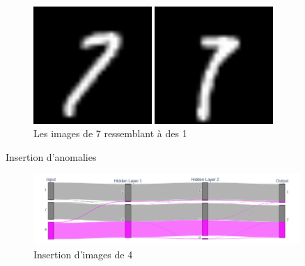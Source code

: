 \documentclass[10pt,handout]{beamer}
\begin{document}
\begin{frame}
        \begin{figure}[h]
        \begin{minipage}[c]{.46\linewidth}
        \centering
        \includegraphics[width=0.4\textwidth]{img/7_3.png}
        \end{minipage}
        \hfill%
        \begin{minipage}[c]{.46\linewidth}
        \centering
        \includegraphics[width=0.4\textwidth]{img/7_4.png}
        \end{minipage}
        \caption{Les images de 7 ressemblant à des 1}
        \label{71}
    \end{figure}
\end{frame}

\begin{frame}{Insertion d’anomalies}
    \begin{figure}[h]
        \centering
        \includegraphics[width=0.9\textwidth]{img/anomalie4_sankey.png}
        \caption{Insertion d’images de 4}
    \end{figure}
\end{frame}
\end{document}
